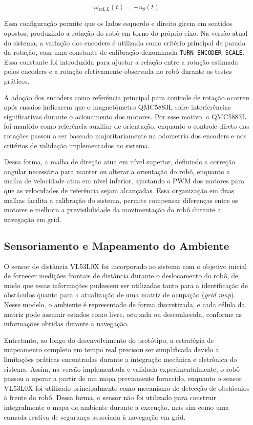 \documentclass[	12pt, Times, openright, twoside, a4paper, english, brazil]{abntex2}
\begin{document}
\begin{equation}
	\omega_{\text{ref},L}(t) = -u_{\theta}(t)
	\label{eq:ref_roda_esquerda_rotacao}
\end{equation}

Essa configuração permite que os lados esquerdo e direito girem em sentidos opostos, produzindo a rotação do robô em torno do próprio eixo. Na versão atual do sistema, a variação dos encoders é utilizada como critério principal de parada da rotação, com uma constante de calibração denominada \texttt{TURN\_ENCODER\_SCALE}. Essa constante foi introduzida para ajustar a relação entre a rotação estimada pelos encoders e a rotação efetivamente observada no robô durante os testes práticos.

A adoção dos encoders como referência principal para controle de rotação ocorreu após ensaios indicarem que o magnetômetro QMC5883L sofre interferências significativas durante o acionamento dos motores. Por esse motivo, o QMC5883L foi mantido como referência auxiliar de orientação, enquanto o controle direto das rotações passou a ser baseado majoritariamente na odometria dos encoders e nos critérios de validação implementados no sistema.

Dessa forma, a malha de direção atua em nível superior, definindo a correção angular necessária para manter ou alterar a orientação do robô, enquanto a malha de velocidade atua em nível inferior, ajustando o PWM dos motores para que as velocidades de referência sejam alcançadas. Essa organização em duas malhas facilita a calibração do sistema, permite compensar diferenças entre os motores e melhora a previsibilidade da movimentação do robô durante a navegação em grid.

\subsection{Sensoriamento e Mapeamento do Ambiente}

O sensor de distância VL53L0X foi incorporado ao sistema com o objetivo inicial de fornecer medições frontais de distância durante o deslocamento do robô, de modo que essas informações pudessem ser utilizadas tanto para a identificação de obstáculos quanto para a atualização de uma matriz de ocupação (\textit{grid map}). Nesse modelo, o ambiente é representado de forma discretizada, e cada célula da matriz pode assumir estados como livre, ocupada ou desconhecida, conforme as informações obtidas durante a navegação.

Entretanto, ao longo do desenvolvimento do protótipo, a estratégia de mapeamento completo em tempo real precisou ser simplificada devido a limitações práticas encontradas durante a integração mecânica e eletrônica do sistema. Assim, na versão implementada e validada experimentalmente, o robô passou a operar a partir de um mapa previamente fornecido, enquanto o sensor VL53L0X foi utilizado principalmente como mecanismo de detecção de obstáculos à frente do robô. Dessa forma, o sensor não foi utilizado para construir integralmente o mapa do ambiente durante a execução, mas sim como uma camada reativa de segurança associada à navegação em grid.
\end{document}
